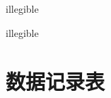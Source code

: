 \documentclass[UTF8,10pt,a4paper,fontset=fandol]{ctexart}
\newcommand{\handwritten}[1]{#1}
\begin{document}
\handwritten{illegible}

\handwritten{illegible}

\newpage

\section*{数据记录表}
\end{document}

